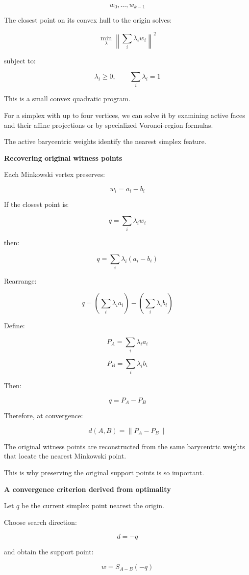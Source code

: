 \[
w_0,\ldots,w_{k-1}
\]

The closest point on its convex hull to the origin solves:

\[
\boxed{ \min_{\lambda} \left\| \sum_i\lambda_iw_i \right\|^2 }
\]

subject to:

\[
\lambda_i\ge0,\qquad \sum_i\lambda_i=1
\]

This is a small convex quadratic program.

For a simplex with up to four vertices, we can solve it by examining active faces and their affine projections or by specialized Voronoi-region formulas.

The active barycentric weights identify the nearest simplex feature.

\textbf{Recovering original witness points}

Each Minkowski vertex preserves:

\[
w_i=a_i-b_i
\]

If the closest point is:

\[
q=\sum_i\lambda_iw_i
\]

then:

\[
q= \sum_i\lambda_i(a_i-b_i)
\]

Rearrange:

\[
q= \left(\sum_i\lambda_ia_i\right) - \left(\sum_i\lambda_ib_i\right)
\]

Define:

\[
\boxed{ P_A=\sum_i\lambda_ia_i }
\]

\[
\boxed{ P_B=\sum_i\lambda_ib_i }
\]

Then:

\[
\boxed{ q=P_A-P_B }
\]

Therefore, at convergence:

\[
\boxed{ d(A,B)=\|P_A-P_B\| }
\]

The original witness points are reconstructed from the same barycentric weights that locate the nearest Minkowski point.

This is why preserving the original support points is so important.

\textbf{A convergence criterion derived from optimality}

Let \(q\) be the current simplex point nearest the origin.

Choose search direction:

\[
d=-q
\]

and obtain the support point:

\[
w=S_{A-B}(-q)
\]


